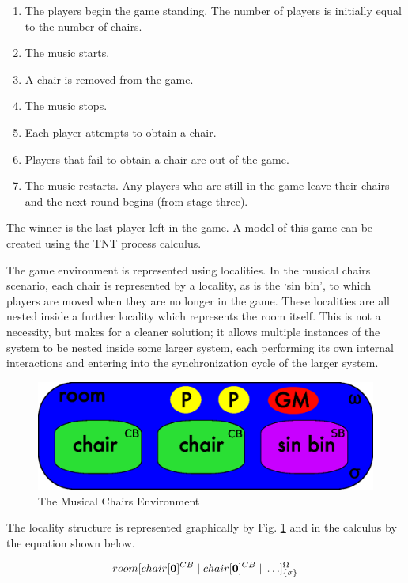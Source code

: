 \begin{enumerate}
\item The players begin the game standing.  The number of players is
initially equal to the number of chairs.
\item The music starts.
\item A chair is removed from the game.
\item The music stops.
\item Each player attempts to obtain a chair.
\item Players that fail to obtain a chair are out of the game.
\item The music restarts.  Any players who are still in the game leave
  their chairs and the next round begins (from stage three).
\end{enumerate}

\noindent The winner is the last player left in the game.  A model of
this game can be created using the TNT process calculus.

The game environment is represented using localities.  In the musical
chairs scenario, each chair is represented by a locality, as is the `sin
bin', to which players are moved when they are no longer in the game.
These localities are all nested inside a further locality which
represents the room itself.  This is not a necessity, but makes for a
cleaner solution; it allows multiple instances of the system to be
nested inside some larger system, each performing its own internal
interactions and entering into the synchronization cycle of the larger
system.

\begin{figure}  
  \centering
  \includegraphics[scale=0.5]{gameenv}
  \caption{The Musical Chairs Environment}
  \label{fig:gameenv}
\end{figure}

The locality structure is represented graphically by Fig. \ref{fig:gameenv}
and in the calculus by the equation shown below.

\begin{equation}
\loc{room}{\nloc{chair}{\nil}{CB} \pc \nloc{chair}{\nil}{CB}
\pc \dots}{\Omega}{\sigma}
\end{equation}

